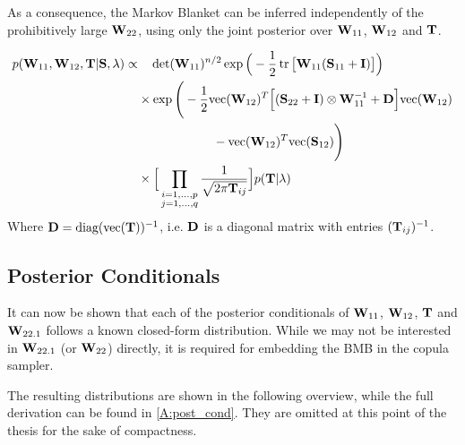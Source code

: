 As a consequence, the Markov Blanket can be inferred independently of the prohibitively large $\mathbf{W}_{22}$, using only the  joint posterior over $\mathbf{W}_{11}$, $\mathbf{W}_{12}$ and $\mathbf{T}$.

\begin{tcolorbox}[colback=red!5!white,colframe=red!60!black, title=Joint Posterior Distribution]
	\begin{align}
	\label{eq:jointpost}
		p(\mathbf{W}_{11}, \mathbf{W}_{12}, \mathbf{T} | \mathbf{S}, \lambda)
		\propto& \quad
		\det(\mathbf{W}_{11})^{n/2} \exp \Big( - \frac{1}{2} \operatorname{tr}\big[ \mathbf{W}_{11} (\mathbf{S}_{11} + \mathbf{I}) \big]\Big)
		\\
		&\times \exp\Bigg(
		-\frac{1}{2}\text{vec}(\mathbf{W}_{12})^T \Big[
		(\mathbf{S}_{22} + \mathbf{I}) \otimes \mathbf{W}_{11}^{-1} +\mathbf{D}\Big]\text{vec}(\mathbf{W}_{12})
		\nonumber\\&\quad \quad  \quad \quad \quad \quad 
		- \text{vec}(\mathbf{W}_{12})^T \text{vec}(\mathbf{S}_{12})
		\Bigg)
		\nonumber \\
		&\times \Big[\prod_{{\substack{i=1,\dots,p\\j=1,\dots,q}} }  \frac{1}{\sqrt{2\pi \mathbf{T}_{ij}}}\Big]
		p(\mathbf{T}|\lambda)
		\nonumber
	\end{align}
	Where $\mathbf{D} = \text{diag}(\text{vec}(\mathbf{T}))^{-1}$,
	i.e. $\mathbf{D}$ is a diagonal matrix with entries $(\mathbf{T}_{ij})^{-1}$.
\end{tcolorbox}

\subsection{Posterior Conditionals}

It can now be shown that each of the posterior conditionals of $\mathbf{W}_{11}$, $\mathbf{W}_{12}$, $\mathbf{T}$ and $\mathbf{W}_{22.1}$ follows a known closed-form distribution.
While we may not be interested in $\mathbf{W}_{22.1}$ (or $\mathbf{W}_{22}$) directly,
it is required for embedding the \gls{BMB} in the copula sampler.

The resulting distributions are shown in the following overview, while the full derivation can be found in \autoref{A:post_cond}.
They are omitted at this point of the thesis for the sake of compactness.

